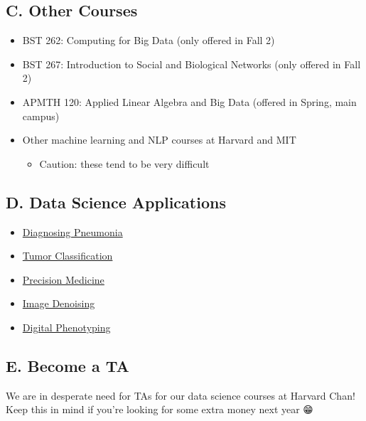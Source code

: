 \documentclass[
]{article}
\providecommand{\tightlist}{%
  \setlength{\itemsep}{0pt}\setlength{\parskip}{0pt}}
\begin{document}
\hypertarget{c.-other-courses}{%
\subsection{C. Other Courses}\label{c.-other-courses}}

\begin{itemize}
\tightlist
\item
  BST 262: Computing for Big Data (only offered in Fall 2)
\item
  BST 267: Introduction to Social and Biological Networks (only offered
  in Fall 2)
\item
  APMTH 120: Applied Linear Algebra and Big Data (offered in Spring,
  main campus)
\item
  Other machine learning and NLP courses at Harvard and MIT

  \begin{itemize}
  \tightlist
  \item
    Caution: these tend to be very difficult
  \end{itemize}
\end{itemize}

\hypertarget{d.-data-science-applications}{%
\subsection{D. Data Science
Applications}\label{d.-data-science-applications}}

\begin{itemize}
\tightlist
\item
  \href{https://news.stanford.edu/2017/11/15/algorithm-outperforms-radiologists-diagnosing-pneumonia/}{Diagnosing
  Pneumonia}
\item
  \href{https://www.sciencebuddies.org/blog/artificial-intelligence-and-cancer-diagnosis-meet-the-2012-google-science-fair-winner}{Tumor
  Classification}
\item
  \href{https://www.forbes.com/sites/oreillymedia/2012/08/20/data-science-and-the-health-care-revolution/\#33d787f129f7}{Precision
  Medicine}
\item
  \href{https://www.ncbi.nlm.nih.gov/pmc/articles/PMC6225344/}{Image
  Denoising}
\item
  \href{https://www.hsph.harvard.edu/onnela-lab/}{Digital Phenotyping}
\end{itemize}

\hypertarget{e.-become-a-ta}{%
\subsection{E. Become a TA}\label{e.-become-a-ta}}

We are in desperate need for TAs for our data science courses at Harvard
Chan! Keep this in mind if you're looking for some extra money next year
😁
\end{document}

